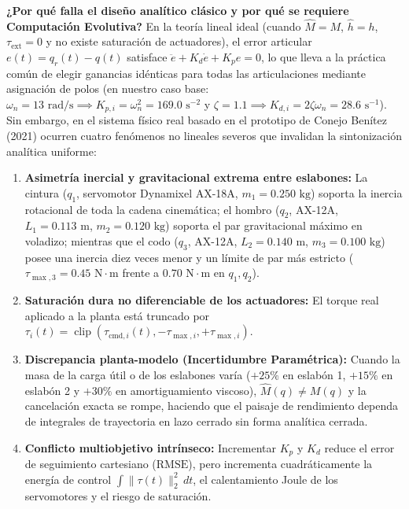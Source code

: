 \documentclass[11pt,a4paper]{article}
\begin{document}
\textbf{¿Por qué falla el diseño analítico clásico y por qué se requiere Computación Evolutiva?}
En la teoría lineal ideal (cuando $\hat{M} = M$, $\hat{h} = h$, $\tau_{\text{ext}} = 0$ y no existe saturación de actuadores), el error articular $e(t) = q_r(t) - q(t)$ satisface $\ddot{e} + K_d\dot{e} + K_p e = 0$, lo que lleva a la práctica común de elegir ganancias idénticas para todas las articulaciones mediante asignación de polos (en nuestro caso base: $\omega_n = 13\text{ rad/s} \implies K_{p,i} = \omega_n^2 = 169.0\text{ s}^{-2}$ y $\zeta = 1.1 \implies K_{d,i} = 2\zeta\omega_n = 28.6\text{ s}^{-1}$). Sin embargo, en el sistema físico real basado en el prototipo de Conejo Benítez (2021) ocurren cuatro fenómenos no lineales severos que invalidan la sintonización analítica uniforme:
\begin{enumerate}
    \item \textbf{Asimetría inercial y gravitacional extrema entre eslabones:} La cintura ($q_1$, servomotor Dynamixel AX-18A, $m_1 = 0.250\text{ kg}$) soporta la inercia rotacional de toda la cadena cinemática; el hombro ($q_2$, AX-12A, $L_1 = 0.113\text{ m}$, $m_2 = 0.120\text{ kg}$) soporta el par gravitacional máximo en voladizo; mientras que el codo ($q_3$, AX-12A, $L_2 = 0.140\text{ m}$, $m_3 = 0.100\text{ kg}$) posee una inercia diez veces menor y un límite de par más estricto ($\tau_{\max,3} = 0.45\text{ N}\cdot\text{m}$ frente a $0.70\text{ N}\cdot\text{m}$ en $q_1, q_2$).
    \item \textbf{Saturación dura no diferenciable de los actuadores:} El torque real aplicado a la planta está truncado por $\tau_i(t) = \operatorname{clip}(\tau_{\text{cmd},i}(t), -\tau_{\max,i}, +\tau_{\max,i})$.
    \item \textbf{Discrepancia planta-modelo (Incertidumbre Paramétrica):} Cuando la masa de la carga útil o de los eslabones varía ($+25\%$ en eslabón 1, $+15\%$ en eslabón 2 y $+30\%$ en amortiguamiento viscoso), $\hat{M}(q) \neq M(q)$ y la cancelación exacta se rompe, haciendo que el paisaje de rendimiento dependa de integrales de trayectoria en lazo cerrado sin forma analítica cerrada.
    \item \textbf{Conflicto multiobjetivo intrínseco:} Incrementar $K_p$ y $K_d$ reduce el error de seguimiento cartesiano ($\text{RMSE}$), pero incrementa cuadráticamente la energía de control $\int \|\tau(t)\|_2^2\,dt$, el calentamiento Joule de los servomotores y el riesgo de saturación.
\end{enumerate}
\end{document}
